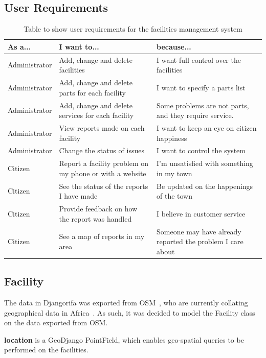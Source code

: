 \subsection{User Requirements}
\begin{table}[h]
\centering
\begin{tabular}{p{2.9cm}p{4.1cm}p{4.1cm}}
\textbf{As a...} & \textbf{I want to...} & \textbf{because...} \\
\hline
Administrator & Add, change and delete facilities & I want full control over the facilities \\
\hline
Administrator & Add, change and delete parts for each facility & I want to specify a parts list \\
\hline
Administrator & Add, change and delete services for each facility & Some problems are not parts, and they require service. \\
\hline
Administrator & View reports made on each facility & I want to keep an eye on citizen happiness \\
\hline
Administrator & Change the status of issues & I want to control the system \\
\hline
Citizen & Report a facility problem on my phone or with a website & I'm unsatisfied with something in my town \\
\hline
Citizen & See the status of the reports I have made & Be updated on the happenings of the town \\
\hline
Citizen & Provide feedback on how the report was handled & I believe in customer service \\
\hline
Citizen & See a map of reports in my area & Someone may have already reported the problem I care about \\
\end{tabular}
\caption{Table to show user requirements for the facilities management system}
\label{tab:rm:fac:req}
\end{table}

\subsection{Facility}
The data in Djangorifa was exported from \gls{OSM}~\cite{openstreetmap}, who are currently collating geographical data in Africa~\cite{openstreetmapafrica}. As such, it was decided to model the Facility class on the data exported from \gls{OSM}.

\textbf{location} is a GeoDjango PointField, which enables geo-spatial queries to be performed on the facilities.

